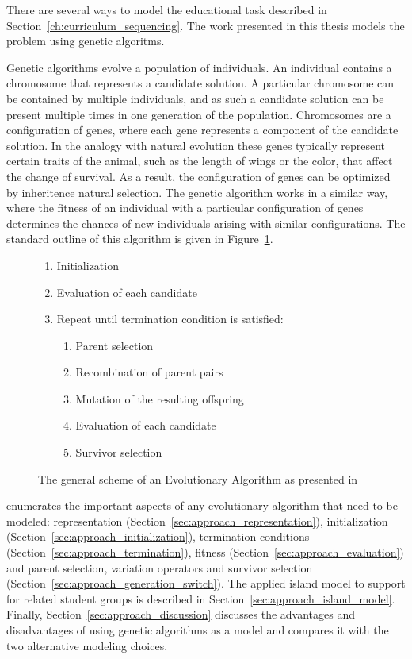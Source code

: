 There are several ways to model the educational task described in
Section~\ref{ch:curriculum_sequencing}. The work presented in this thesis models the
problem using genetic algoritms.

Genetic algorithms evolve a population of individuals. An individual contains a
chromosome that represents a candidate solution. A particular chromosome can be contained by
multiple individuals, and as such a candidate solution can be present multiple
times in one generation of the population. Chromosomes are a configuration of
genes, where each gene represents a component of the candidate solution. In the
analogy with natural evolution these genes typically represent certain traits
of the animal, such as the length of wings or the color, that affect the change
of survival. As a result, the configuration of genes can be optimized by inheritence
natural selection. The genetic algorithm works in a similar way, where the
fitness of an individual with a particular configuration of genes determines
the chances of new individuals arising with similar configurations. The
standard outline of this algorithm is given in Figure~\ref{alg:ea_scheme}.
\label{approach_genetic_algorithm}
\begin{figure}[ht!]
	\begin{framed}
		\begin{enumerate}
			\item Initialization
			\item Evaluation of each candidate
			\item Repeat until termination condition is satisfied:
				\begin{enumerate}
					\item Parent selection
					\item Recombination of parent pairs
					\item Mutation of the resulting offspring
					\item Evaluation of each candidate
					\item Survivor selection
				\end{enumerate}
		\end{enumerate}
	\end{framed}
	\caption[The evolutionary algorithm]{The general scheme of an
		Evolutionary Algorithm as presented in \citep{Eiben2007}}
	\label{alg:ea_scheme}
\end{figure}

\citep{Eiben2007} enumerates the important aspects of any
evolutionary algorithm that need to be modeled: representation
(Section~\ref{sec:approach_representation}), initialization
(Section~\ref{sec:approach_initialization}), termination conditions
(Section~\ref{sec:approach_termination}), fitness
(Section~\ref{sec:approach_evaluation}) and parent selection, variation
operators and survivor selection
(Section~\ref{sec:approach_generation_switch}). The applied island model to
support for related student groups is described in
Section~\ref{sec:approach_island_model}.
Finally, Section~\ref{sec:approach_discussion} discusses the advantages and
disadvantages of using genetic algorithms as a model and compares it with the
two alternative modeling choices.


